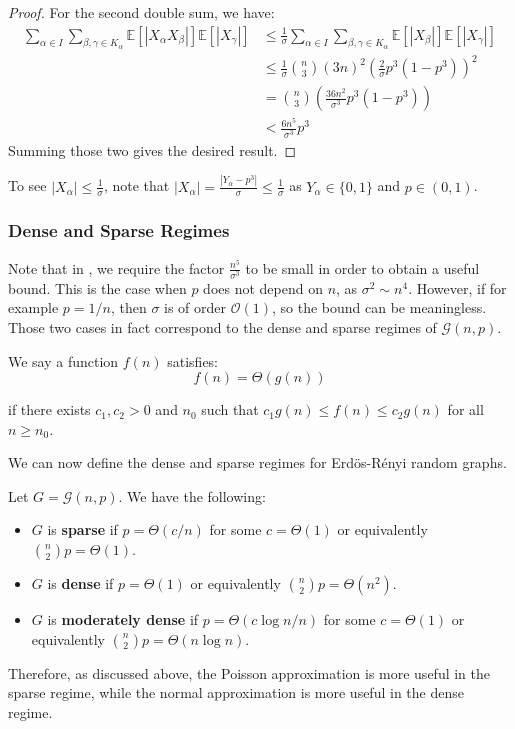 \documentclass{article}
\begin{document}
\begin{proof}
    For the second double sum, we have:
    \begin{align*}
        \sum_{\alpha\in I}\sum_{\beta,\gamma\in K_{\alpha}}\mathbb{E}[|X_{\alpha}X_{\beta}|]\mathbb{E}[|X_{\gamma}|] &\leq \frac{1}{\sigma}  \sum_{\alpha\in I}\sum_{\beta,\gamma\in K_{\alpha}}\mathbb{E}[|X_{\beta}|] \mathbb{E}[|X_{\gamma}|] \\
        &\leq \frac{1}{\sigma} \binom{n}{3} (3n)^2 \left(\frac{2}{\sigma}p^{3}(1-p^{3})\right)^2 \\
        &=\binom{n}{3} \left(\frac{36n^2}{\sigma^3}p^{3}(1-p^{3})\right) \\
        &< \frac{6n^5}{\sigma^3} p^3
    \end{align*}
    Summing those two gives the desired result.
\end{proof}

\begin{remark}
    To see $|X_\alpha| \leq \frac{1}{\sigma}$, note that $|X_\alpha| = \frac{|Y_\alpha - p^3|}{\sigma} \leq \frac{1}{\sigma}$ as $Y_\alpha \in \{0,1\}$ and $p\in (0,1)$.
\end{remark}

\subsubsection{Dense and Sparse Regimes}  

Note that in , we require the factor $\frac{n^5}{\sigma^3}$ to be small in order to obtain a useful bound. This is the case when $p$ does not depend on $n$, as $\sigma^2 \sim n^4$. However, if for example $p=1/n$, then $\sigma$ is of order $\mathcal{O}(1)$, so the bound can be meaningless.  Those two cases in fact correspond to the dense and sparse regimes of $\mathcal{G}(n,p)$.  

\begin{definition}
    We say a function $f(n)$ satisfies:
    \[
        f(n) = \Theta(g(n))
        \]

    if there exists $c_1, c_2 > 0$ and $n_0$ such that $c_1 g(n) \leq f(n) \leq c_2 g(n)$ for all $n\geq n_0$.
\end{definition}

We can now define the dense and sparse regimes for Erd\"os-R\'enyi random graphs.

\begin{definition}
    Let $G=\mathcal{G}(n,p)$. We have the following:
    \begin{itemize}
        \item $G$ is \textbf{sparse} if $p=\Theta(c/n)$ for some $c=\Theta(1)$ or equivalently $\binom{n}{2}p=\Theta(1)$.
        \item $G$ is \textbf{dense} if $p=\Theta(1)$ or equivalently $\binom{n}{2}p=\Theta(n^2)$.
        \item $G$ is \textbf{moderately dense} if $p=\Theta(c\log n/n)$ for some $c=\Theta(1)$ or equivalently $\binom{n}{2}p=\Theta(n\log n)$.
    \end{itemize}
\end{definition}

Therefore, as discussed above, the Poisson approximation is more useful in the sparse regime, while the normal approximation is more useful in the dense regime.  


\newpage


\end{document}
